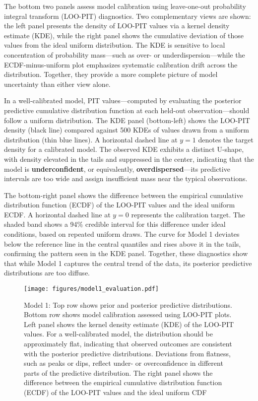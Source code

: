 \documentclass[preprint,authoryear]{elsarticle}
\begin{document}
The bottom two panels assess model calibration using leave-one-out probability integral transform (LOO-PIT) diagnostics. Two complementary views are shown: the left panel presents the density of LOO-PIT values via a kernel density estimate (KDE), while the right panel shows the cumulative deviation of those values from the ideal uniform distribution. The KDE is sensitive to local concentration of probability mass—such as over- or underdispersion—while the ECDF-minus-uniform plot emphasizes systematic calibration drift across the distribution. Together, they provide a more complete picture of model uncertainty than either view alone.

In a well-calibrated model, PIT values—computed by evaluating the posterior predictive cumulative distribution function at each held-out observation—should follow a uniform distribution. The KDE panel (bottom-left) shows the LOO-PIT density (black line) compared against 500 KDEs of values drawn from a uniform distribution (thin blue lines). A horizontal dashed line at $y = 1$ denotes the target density for a calibrated model. The observed KDE exhibits a distinct U-shape, with density elevated in the tails and suppressed in the center, indicating that the model is \textbf{underconfident}, or equivalently, \textbf{overdispersed}—its predictive intervals are too wide and assign insufficient mass near the typical observations.

The bottom-right panel shows the difference between the empirical cumulative distribution function (ECDF) of the LOO-PIT values and the ideal uniform ECDF. A horizontal dashed line at $y = 0$ represents the calibration target. The shaded band shows a 94\% credible interval for this difference under ideal conditions, based on repeated uniform draws. The curve for Model 1 deviates below the reference line in the central quantiles and rises above it in the tails, confirming the pattern seen in the KDE panel. Together, these diagnostics show that while Model 1 captures the central trend of the data, its posterior predictive distributions are too diffuse.


\begin{figure}[H]
\centering
\texttt{[image: figures/model1\_evaluation.pdf]}
\caption{Model 1: Top row shows prior and posterior predictive distributions. Bottom row shows model calibration assessed using LOO-PIT plots. Left panel shows the kernel density estimate (KDE) of the LOO-PIT values. For a well-calibrated model, the distribution should be approximately flat, indicating that observed outcomes are consistent with the posterior predictive distributions. Deviations from flatness, such as peaks or dips, reflect under- or overconfidence in different parts of the predictive distribution. The right panel shows the difference between the empirical cumulative distribution function (ECDF) of the LOO-PIT values and the ideal uniform CDF }
\label{fig:model1-eval}
\end{figure}
\end{document}
